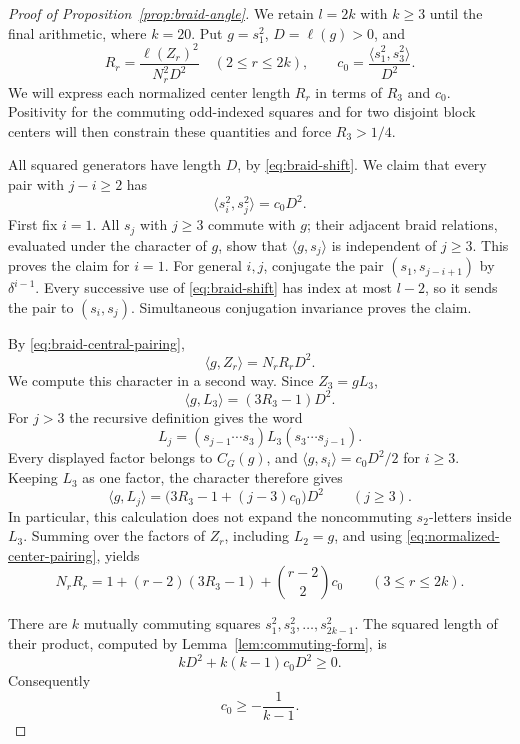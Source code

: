 \begin{proof}[Proof of Proposition~\ref{prop:braid-angle}]
We retain $l=2k$ with $k\ge3$ until the final arithmetic, where $k=20$.
Put
$g=s_1^2$, $D=\ell(g)>0$, and
\[
 R_r=\frac{\ell(Z_r)^2}{N_r^2D^2}\quad(2\le r\le 2k),\qquad
 c_0=\frac{\langle s_1^2,s_3^2\rangle}{D^2}.
\]
We will express each normalized center length $R_r$ in terms of $R_3$
and $c_0$.  Positivity for the commuting odd-indexed squares and for two
disjoint block centers will then constrain these quantities and force
$R_3>1/4$.

All squared generators have length $D$, by
\eqref{eq:braid-shift}.  We claim that every pair with $j-i\ge2$ has
\begin{equation}\label{eq:nonadjacent-pairing}
 \langle s_i^2,s_j^2\rangle=c_0D^2.
\end{equation}
First fix $i=1$.  All $s_j$ with $j\ge3$ commute with $g$; their
adjacent braid relations, evaluated under the character of $g$, show
that $\langle g,s_j\rangle$ is independent of $j\ge3$.
This proves the claim for $i=1$.  For general $i,j$, conjugate the pair
$(s_1,s_{j-i+1})$ by $\delta^{i-1}$.  Every successive use of
\eqref{eq:braid-shift} has index at most $l-2$, so it sends the pair
to $(s_i,s_j)$.  Simultaneous conjugation invariance proves the claim.

By \eqref{eq:braid-central-pairing},
\begin{equation}\label{eq:normalized-center-pairing}
 \langle g,Z_r\rangle=N_rR_rD^2.
\end{equation}
We compute this character in a second way.  Since $Z_3=gL_3$,
\[
 \langle g,L_3\rangle=(3R_3-1)D^2.
\]
For $j>3$ the recursive definition gives the word
\[
 L_j=(s_{j-1}\cdots s_3)L_3(s_3\cdots s_{j-1}).
\]
Every displayed factor belongs to $C_G(g)$, and
$\langle g,s_i\rangle=c_0D^2/2$ for $i\ge3$.  Keeping $L_3$ as one
factor, the character therefore gives
\[
 \langle g,L_j\rangle
   =\bigl(3R_3-1+(j-3)c_0\bigr)D^2\qquad(j\ge3).
\]
In particular, this calculation does not expand the noncommuting
$s_2$-letters inside $L_3$.  Summing over the factors of $Z_r$, including
$L_2=g$, and using \eqref{eq:normalized-center-pairing}, yields
\begin{equation}\label{eq:braid-recursion}
 N_rR_r=1+(r-2)(3R_3-1)+\binom{r-2}{2}c_0
 \qquad(3\le r\le 2k).
\end{equation}

There are $k$ mutually commuting squares
$s_1^2,s_3^2,\ldots,s_{2k-1}^2$.  The squared length of their product,
computed by Lemma~\ref{lem:commuting-form}, is
\[
 kD^2+k(k-1)c_0D^2\ge0.
\]
Consequently
\begin{equation}\label{eq:lower-cross-pairing}
 c_0\ge-\frac1{k-1}.
\end{equation}


\end{proof}
